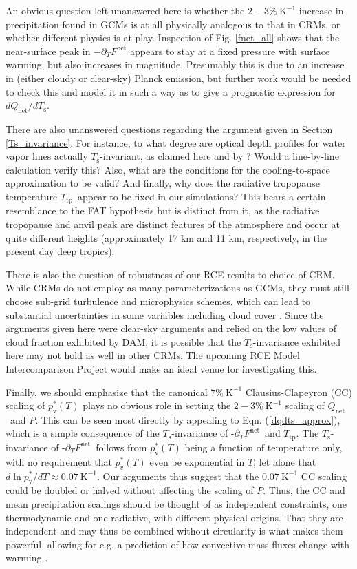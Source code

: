 \documentclass[10pt]{article}
\newcommand{\eqnref}[1]{(\ref{#1})}
\newcommand{\ppt}{\ensuremath{\partial_T}}
\newcommand{\Qnet}{\ensuremath{Q_\mathrm{net}}}
\newcommand{\Fnet}{\ensuremath{F^\mathrm{net}}}
\newcommand{\pvstar}{\ensuremath{p^*_{\mathrm{v}}}}
\newcommand{\Ts}{\ensuremath{T_\mathrm{s}}}
\newcommand{\Ttp}{\ensuremath{T_\mathrm{tp}}}
\newcommand{\Kinverse}{\ensuremath{\mathrm{K^{-1}}}}
\begin{document}
An obvious question left unanswered here is whether the $2 -3\%\ \Kinverse$ increase in precipitation found in GCMs is at all physically analogous to that in CRMs, or whether different physics is at play. Inspection of Fig. \ref{fnet_all} shows that the near-surface peak in $-\ppt \Fnet$ appears to stay at a fixed pressure with surface warming, but also increases in magnitude. Presumably this is due to an increase in (either cloudy or clear-sky) Planck emission, but further work would be needed to check this and model it in such a way as to give a prognostic expression for $d\Qnet/d\Ts$. 

There are also unanswered questions regarding the  argument given in Section \ref{Ts_invariance}. For instance, to what degree are optical depth profiles for water vapor lines actually \Ts-invariant, as claimed here and by \cite{ingram2010}? Would a line-by-line calculation verify this?  Also, what are the conditions for the cooling-to-space approximation to be valid? And finally, why does  the radiative tropopause temperature \Ttp\ appear to be fixed in our simulations? This bears a certain resemblance to the FAT hypothesis but is distinct from it, as the radiative tropopause and anvil peak are distinct features of the atmosphere and occur at quite different heights (approximately 17 km and 11 km, respectively, in the present day deep tropics).

There is also the question of robustness of our RCE results to choice of CRM. While CRMs do not employ as many parameterizations as GCMs, they must still choose sub-grid turbulence and microphysics schemes, which can lead to substantial uncertainties in some variables including cloud cover \citep[e.g.][]{tsushima2015, igel2014}. Since the arguments given here were clear-sky arguments and relied on the low values of  cloud fraction exhibited by DAM, it is possible that the \Ts-invariance exhibited here may not hold as well in other CRMs. The upcoming RCE Model Intercomparison Project \citep[RCEMIP,][]{wing2017b} would make an ideal venue for investigating this.

Finally, we should emphasize that the canonical $7\%\ \Kinverse$ Clausius-Clapeyron (CC) scaling of $\pvstar(T)$ plays no obvious role in setting the $2 -3\%\ \Kinverse$  scaling of \Qnet\ and $P$. This can be seen most directly by appealing to Eqn. \eqnref{dqdts_approx}, which is a simple consequence of the \Ts-invariance of -\ppt \Fnet\ and \Ttp. The \Ts-invariance of -\ppt \Fnet\  follows from  $\pvstar(T)$ being a function of temperature only, with no requirement that $p_v^*(T)$ even be exponential in $T$, let alone that $d\ln \pvstar/dT \approx 0.07 \ \Kinverse$.  Our arguments thus suggest that the $0.07 \ \Kinverse$ CC scaling  could be doubled or halved without affecting the scaling of $P$. Thus, the CC and mean precipitation scalings should be thought of as independent constraints, one thermodynamic and one radiative, with different physical origins. That they are independent and may thus be combined without circularity is what makes them powerful, allowing for e.g. a prediction of how convective mass fluxes change with warming \citep[][]{held2006}.
\end{document}

